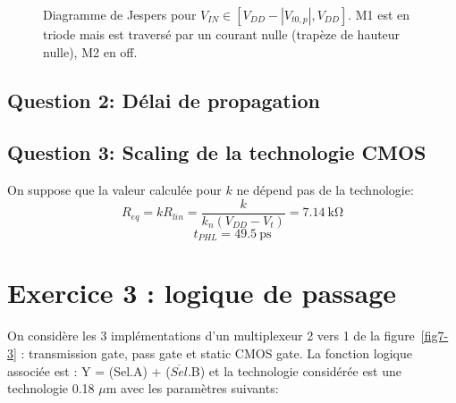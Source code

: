 \documentclass[frenchb,DIV=14]{scrartcl}
\begin{document}
\begin{figure}[ht]
	\centering
	\caption{Diagramme de Jespers pour $V_{IN} \in [V_{DD}-|V_{t0,p}|, V_{DD}]$.
	M1 est en triode mais est traversé par un courant nulle (trapèze de hauteur nulle),
	M2 en off.}
	\label{fig:jsp5}
\end{figure}

\subsection*{Question 2: Délai de propagation}

\subsection*{Question 3: Scaling de la technologie CMOS}

On suppose que la valeur calculée pour $k$ ne dépend pas de la technologie:
\[R_{eq} = k R_{lin} = \frac{k}{k_n (V_{DD} - V_t)} = \SI{7.14}{\kilo\ohm} \]
\[t_{PHL} = \SI{49.5}{\pico\second} \]

\newpage
\section*{Exercice 3 : logique de passage}
On considère les 3 implémentations d'un multiplexeur 2 vers 1 de la figure~\ref{fig7-3} :
transmission gate, pass gate et static CMOS gate. La fonction logique associée est :
Y = (Sel.A) + ($\overline{Sel}$.B) et la technologie considérée est une technologie
0.18 $\mu$m avec les paramètres suivants:
\end{document}
